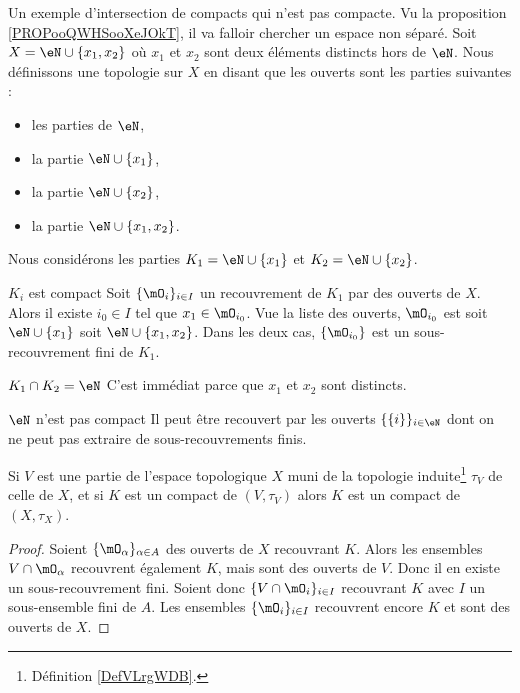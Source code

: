 \begin{example}
	Un exemple d'intersection de compacts qui n'est pas compacte. Vu la proposition \ref{PROPooQWHSooXeJOkT}, il va falloir chercher un espace non séparé. Soit \( X=\eN\cup\{ x_1,x_2 \}\) où \( x_1\) et \( x_2\) sont deux éléments distincts hors de \( \eN\). Nous définissons une topologie sur \( X\) en disant que les ouverts sont les parties suivantes :
	\begin{itemize}
		\item les parties de \( \eN\),
		\item la partie \( \eN\cup\{ x_1 \}\),
		\item la partie \( \eN\cup\{ x_2 \}\),
		\item la partie \( \eN\cup\{ x_1,x_2 \}\).
	\end{itemize}
	Nous considérons les parties \( K_1=\eN\cup\{ x_1 \}\) et \(K_2= \eN\cup \{ x_2 \}\).
	\begin{subproof}
		\item[\( K_i\) est compact]
		Soit \( \{ \mO_i \}_{i\in I}\) un recouvrement de \( K_1\) par des ouverts de \( X\). Alors il existe \( i_0\in I\) tel que \( x_1\in\mO_{i_0}\). Vue la liste des ouverts, \( \mO_{i_0}\) est soit \( \eN\cup\{ x_1 \}\) soit \( \eN\cup\{ x_1,x_2 \}\). Dans les deux cas, \( \{ \mO_{i_0} \}\) est un sous-recouvrement fini de \( K_1\).
		\item[\( K_1\cap K_2=\eN\)]
		C'est immédiat parce que \( x_1\) et \( x_2\) sont distincts.
		\item[\( \eN\) n'est pas compact]
		Il peut être recouvert par les ouverts \( \{ \{ i \} \}_{i\in \eN}\) dont on ne peut pas extraire de sous-recouvrements finis.
	\end{subproof}
\end{example}

\begin{proposition}     \label{PropGBZUooRKaOxy}
	Si \( V\) est une partie de l'espace topologique \( X\) muni de la topologie induite\footnote{Définition \ref{DefVLrgWDB}.} \( \tau_V\) de celle de \( X\), et si \( K\) est un compact de \( (V,\tau_V)\) alors \( K\) est un compact de \( (X,\tau_X)\).
\end{proposition}

\begin{proof}
	Soient \( \{ \mO_\alpha \}_{\alpha\in A}  \) des ouverts de \( X\) recouvrant \( K\). Alors les ensembles \( V\cap \mO_{\alpha}\) recouvrent également \( K\), mais sont des ouverts de \( V\). Donc il en existe un sous-recouvrement fini. Soient donc \( \{V\cap\mO_i\}_{i\in I}\) recouvrant \( K\) avec \( I\) un sous-ensemble fini de \( A\). Les ensembles \( \{\mO_i\}_{i\in I}\) recouvrent encore \( K\) et sont des ouverts de \( X\).
\end{proof}

